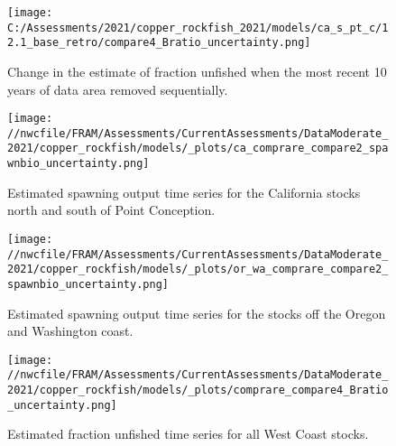 \documentclass[11pt,
  english,
  a4paper,
]{article}
\begin{document}
\tagmcend\tagstructend


\begin{figure}
\centering
\texttt{[image: C:/Assessments/2021/copper\_rockfish\_2021/models/ca\_s\_pt\_c/12.1\_base\_retro/compare4\_Bratio\_uncertainty.png]}
\caption{Change in the estimate of fraction unfished when the most recent 10 years of data area removed sequentially.\label{fig:retro-depl}}
\end{figure}

\tagmcend\tagstructend

\newpage


\begin{figure}
\centering
\texttt{[image: //nwcfile/FRAM/Assessments/CurrentAssessments/DataModerate\_2021/copper\_rockfish/models/\_plots/ca\_comprare\_compare2\_spawnbio\_uncertainty.png]}
\caption{Estimated spawning output time series for the California stocks north and south of Point Conception.\label{fig:ssb-ca-compare}}
\end{figure}

\tagmcend\tagstructend


\begin{figure}
\centering
\texttt{[image: //nwcfile/FRAM/Assessments/CurrentAssessments/DataModerate\_2021/copper\_rockfish/models/\_plots/or\_wa\_comprare\_compare2\_spawnbio\_uncertainty.png]}
\caption{Estimated spawning output time series for the stocks off the Oregon and Washington coast.\label{fig:ssb-orwa-compare}}
\end{figure}

\tagmcend\tagstructend


\begin{figure}
\centering
\texttt{[image: //nwcfile/FRAM/Assessments/CurrentAssessments/DataModerate\_2021/copper\_rockfish/models/\_plots/comprare\_compare4\_Bratio\_uncertainty.png]}
\caption{Estimated fraction unfished time series for all West Coast stocks.\label{fig:depl-compare}}
\end{figure}
\end{document}
